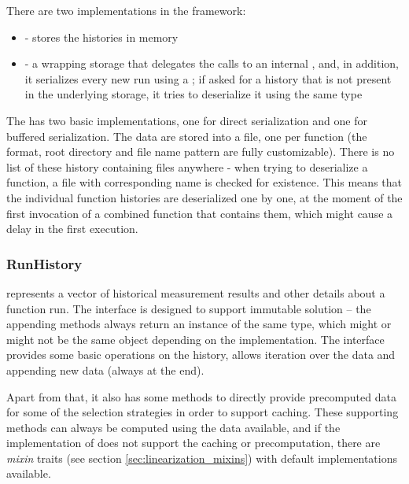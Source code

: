 There are two implementations in the framework:

\begin{itemize}
	\item{} - stores the histories in memory
	\item{} - a wrapping storage that delegates the calls to an internal , and, in addition, it serializes every new run using a ; if asked for a history that is not present in the underlying storage, it tries to deserialize it using the same type
\end{itemize}

The  has two basic implementations, one for direct serialization and one for buffered serialization. The data are stored into a file, one per function (the format, root directory and file name pattern are fully customizable). There is no list of these history containing files anywhere - when trying to deserialize a function, a file with corresponding name is checked for existence. This means that the individual function histories are deserialized one by one, at the moment of the first invocation of a combined function that contains them, which might cause a delay in the first execution.

\subsubsection{RunHistory}
\label{subsubsec:run_history}

 represents a vector of historical measurement results and other details about a function run. The interface is designed to support immutable solution -- the appending methods always return an instance of the same type, which might or might not be the same object depending on the implementation. The interface provides some basic operations on the history, allows iteration over the data and appending new data (always at the end). 

Apart from that, it also has some methods to directly provide precomputed data for some of the selection strategies in order to support caching. These supporting methods can always be computed using the data available, and if the implementation of  does not support the caching or precomputation, there are \textit{mixin} traits (see section \ref{sec:linearization_mixins}) with default implementations available.

